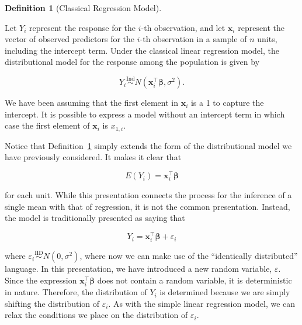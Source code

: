\documentclass[
  letterpaper,
  DIV=11,
  numbers=noendperiod]{scrreprt}
\theoremstyle{definition}
\newtheorem{definition}{Definition}[chapter]
\theoremstyle{plain}
\theoremstyle{definition}
\theoremstyle{remark}
\begin{document}
\begin{definition}[Classical Regression
Model]\protect\hypertarget{def-multiple-model}{}\label{def-multiple-model}

Let \(Y_i\) represent the response for the \(i\)-th observation, and let
\(\mathbf{x}_i\) represent the vector of observed predictors for the
\(i\)-th observation in a sample of \(n\) units, including the intercept
term. Under the classical linear regression model, the distributional
model for the response among the population is given by

\[Y_i \stackrel{\text{Ind}}{\sim} N\left(\mathbf{x}_i^\top \boldsymbol{\beta}, \sigma^2\right).\]

\end{definition}

\begin{tcolorbox}[enhanced jigsaw, rightrule=.15mm, leftrule=.75mm, opacityback=0, coltitle=black, bottomrule=.15mm, opacitybacktitle=0.6, left=2mm, colframe=quarto-callout-note-color-frame, breakable, colback=white, arc=.35mm, toprule=.15mm, toptitle=1mm, bottomtitle=1mm, title=\textcolor{quarto-callout-note-color}{\faInfo}\hspace{0.5em}{Note}, titlerule=0mm, colbacktitle=quarto-callout-note-color!10!white]

We have been assuming that the first element in \(\mathbf{x}_i\) is a 1
to capture the intercept. It is possible to express a model without an
intercept term in which case the first element of \(\mathbf{x}_i\) is
\(x_{1,i}\).

\end{tcolorbox}

Notice that Definition~\ref{def-multiple-model} simply extends the form
of the distributional model we have previously considered. It makes it
clear that

\[E\left(Y_i\right) = \mathbf{x}_i^\top \boldsymbol{\beta}\]

for each unit. While this presentation connects the process for the
inference of a single mean with that of regression, it is not the common
presentation. Instead, the model is traditionally presented as saying
that

\[Y_i = \mathbf{x}_i^\top \boldsymbol{\beta} + \varepsilon_i\]

where
\(\varepsilon_i \stackrel{\text{IID}}{\sim} N\left(0, \sigma^2\right)\),
where now we can make use of the ``identically distributed'' language.
In this presentation, we have introduced a new random variable,
\(\varepsilon\). Since the expression
\(\mathbf{x}_i^\top \boldsymbol{\beta}\) does not contain a random
variable, it is deterministic in nature. Therefore, the distribution of
\(Y_i\) is determined because we are simply shifting the distribution of
\(\varepsilon_i\). As with the simple linear regression model, we can
relax the conditions we place on the distribution of \(\varepsilon_i\).
\end{document}
